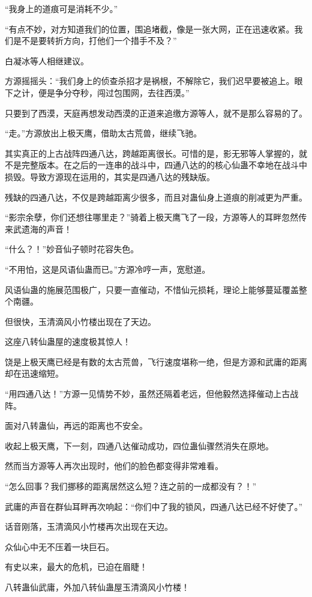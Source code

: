 \begin{this_body}
“我身上的道痕可是消耗不少。”

“有点不妙，对方知道我们的位置，围追堵截，像是一张大网，正在迅速收紧。我们是不是要转折方向，打他们一个措手不及？”

白凝冰等人相继建议。

方源摇摇头：“我们身上的侦查杀招才是祸根，不解除它，我们迟早要被追上。眼下之计，便是争分夺秒，闯过包围网，去往西漠。”

只要到了西漠，天庭再想发动西漠的正道来追缴方源等人，就不是那么容易的了。

“走。”方源放出上极天鹰，借助太古荒兽，继续飞驰。

其实真正的上古战阵四通八达，跨越距离很长。可惜的是，影无邪等人掌握的，就不是完整版本。在之后的一连串的战斗中，四通八达的的核心仙蛊不幸地在战斗中损毁。导致方源现在运用的，其实是四通八达的残缺版。

残缺的四通八达，不仅是跨越距离少很多，而且对蛊仙身上道痕的削减更为严重。

“影宗余孽，你们还想往哪里走？”骑着上极天鹰飞了一段，方源等人的耳畔忽然传来武遗海的声音！

“什么？！”妙音仙子顿时花容失色。

“不用怕，这是风语仙蛊而已。”方源冷哼一声，宽慰道。

风语仙蛊的施展范围极广，只要一直催动，不惜仙元损耗，理论上能够蔓延覆盖整个南疆。

但很快，玉清滴风小竹楼出现在了天边。

这座八转仙蛊屋的速度极其惊人！

饶是上极天鹰已经是有数的太古荒兽，飞行速度堪称一绝，但是方源和武庸的距离却在迅速缩短。

“用四通八达！”方源一见情势不妙，虽然还隔着老远，但他毅然选择催动上古战阵。

面对八转蛊仙，再远的距离也不安全。

收起上极天鹰，下一刻，四通八达催动成功，四位蛊仙骤然消失在原地。

然而当方源等人再次出现时，他们的脸色都变得非常难看。

“怎么回事？我们挪移的距离居然这么短？连之前的一成都没有？！”

武庸的声音在群仙耳畔再次响起：“你们中了我的锁风，四通八达已经不好使了。”

话音刚落，玉清滴风小竹楼再次出现在天边。

众仙心中无不压着一块巨石。

有史以来，最大的危机，已迫在眉睫！

八转蛊仙武庸，外加八转仙蛊屋玉清滴风小竹楼！

\end{this_body}

